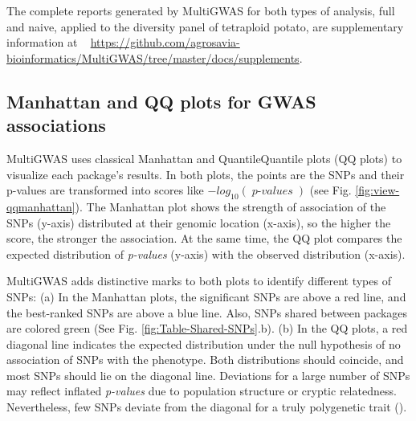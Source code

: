 \documentclass{article}
\newcommand{\mathB}[1]{{\operatorname{\mathit{#1}}}}
\begin{document}
The complete reports generated by MultiGWAS for both types of analysis, full and naive, applied to the diversity panel of tetraploid potato, are supplementary information at ~ \url{https://github.com/agrosavia-bioinformatics/MultiGWAS/tree/master/docs/supplements}.



\subsection{Manhattan and QQ plots for GWAS associations }

MultiGWAS uses classical Manhattan and Quantile\textendash Quantile plots (QQ plots) to visualize each package's results. In both plots, the points are the SNPs and their p-values are transformed into scores like $-log_{10}(\mathB{p-values})$ (see Fig. \ref{fig:view-qqmanhattan}). The Manhattan plot shows the strength of association of the SNPs (y-axis) distributed at their genomic location (x-axis), so the higher the score, the stronger the association. At the same time, the QQ plot compares the expected distribution of \emph{p-values} (y-axis) with the observed distribution (x-axis).

MultiGWAS adds distinctive marks to both plots to identify different types of SNPs: (a) In the Manhattan plots, the significant SNPs are above a red line, and the best-ranked SNPs are above a blue line. Also, SNPs shared between packages are colored green (See Fig. \ref{fig:Table-Shared-SNPs}.b). (b) In the QQ plots, a red diagonal line indicates the expected distribution under the null hypothesis of no association of SNPs with the phenotype. Both distributions should coincide, and most SNPs should lie on the diagonal line. Deviations for a large number of SNPs may reflect inflated {\emph{p-values }}due to population structure or cryptic relatedness. Nevertheless, few SNPs deviate from the diagonal for a truly polygenetic trait (\cite{Power2016}).
\end{document}
